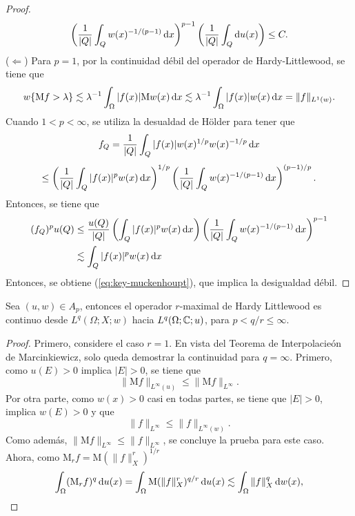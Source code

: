 \begin{proof}
	\begin{equation*}
			\left(\frac{1}{|Q|}\int_{Q} w(x)^{-1/(p-1)}\mathop{}\!\mathrm{d} x \right)^{p-1} \left(\frac{1}{|Q|}\int_Q\mathop{}\!\mathrm{d} u(x)\right) \leq C.
	\end{equation*}
	($\Leftarrow$) Para $p=1$, por la continuidad débil del operador de Hardy-Littlewood, se tiene que 
	\begin{equation*}
		w\{\mathrm{M}f>\lambda\} \lesssim \lambda^{-1} \int_\Omega |f(x)| \mathrm{M}w(x) \mathop{}\!\mathrm{d} x \lesssim \lambda^{-1} \int_\Omega |f(x)| w(x) \mathop{}\!\mathrm{d} x = \|f\|_{L^1(w)}.
	\end{equation*}
	Cuando $1<p<\infty$, se utiliza la desualdad de H\"older para tener que 
	\begin{equation*}
		f_Q = \frac{1}{|Q|} \int_Q |f(x)|w(x)^{1/p}w(x)^{-1/p} \mathop{}\!\mathrm{d} x 
	\end{equation*}
	\begin{equation*}
		\leq \left(\frac{1}{|Q|}\int_Q  |f(x)|^pw(x)\mathop{}\!\mathrm{d} x \right)^{1/p} \left(\frac{1}{|Q|}\int_Q w(x)^{-1/(p-1)}\mathop{}\!\mathrm{d} x \right)^{(p-1)/p}.
	\end{equation*}
	Entonces, se tiene que 
	\begin{align*}
		(f_Q)^pu(Q) & \leq \frac{u(Q)}{|Q|}  \left(\int_Q  |f(x)|^pw(x)\mathop{}\!\mathrm{d} x \right) \left(\frac{1}{|Q|}\int_Q w(x)^{-1/(p-1)}\mathop{}\!\mathrm{d} x \right)^{p-1}\\ 
		&  \lesssim \int_Q  |f(x)|^pw(x)\mathop{}\!\mathrm{d} x 
	\end{align*}
	Entonces, se obtiene (\ref{eq:key-muckenhoupt}), que implica la desigualdad débil.
\end{proof}
\begin{corollary}\label{cor:muckenhoupt}
	Sea $(u, w)\in A_p$, entonces el operador $r$-maximal de Hardy Littlewood es continuo desde $L^q(\Omega; X;w)$ hacia $L^q(\Omega;\mathbb{C};u)$, para $p<q/r\leq\infty$.
\end{corollary}
\begin{proof}
	Primero, considere el caso $r=1$. En vista del Teorema de Interpolacieón de Marcinkiewicz, solo queda demostrar la continuidad para $q=\infty$. Primero, como $u(E)>0$ implica $|E|>0$, se tiene que 
	\begin{equation*}
		\|\mathrm{M}f\|_{L^\infty(u)} \leq \|\mathrm{M}f\|_{L^\infty}.
	\end{equation*}
	Por otra parte, como $w(x)>0$ casi en todas partes, se tiene que $|E|>0$, implica $w(E)>0$ y que 
	\begin{equation*}
		\|f\|_{L^\infty} \leq \|f\|_{L^\infty(w)}.
	\end{equation*}
	Como además, $\|\mathrm{M}f\|_{L^\infty} \leq \|f\|_{L^\infty}$, se concluye la prueba para este caso. Ahora, como $\mathrm{M}_rf=\mathrm{M}(\|f\|_X^r)^{1/r}$
	\begin{equation*}
		\int_\Omega (\mathrm{M}_rf)^q \mathop{}\!\mathrm{d} u(x) = \int_\Omega \mathrm{M}(\|f\|_X^r)^{q/r} \mathop{}\!\mathrm{d} u(x) \lesssim \int_\Omega \|f\|_X^q \mathop{}\!\mathrm{d} w(x),
	\end{equation*}
\end{proof}
